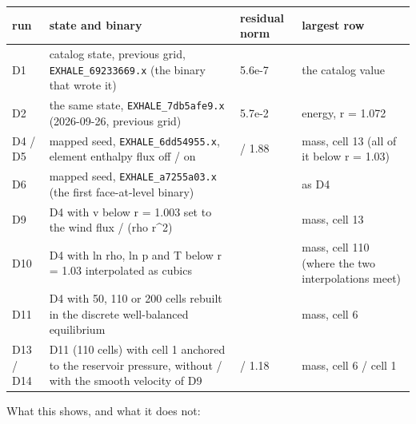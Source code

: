 \documentclass[english,a4paper]{my_memo}
\begin{document}
{\def\LTcaptype{none} %
{\small
\begin{longtable}[]{@{}>{\raggedright\arraybackslash}p{\dimexpr(\linewidth-8\tabcolsep)/4\relax}>{\raggedright\arraybackslash}p{\dimexpr(\linewidth-8\tabcolsep)/4\relax}>{\raggedright\arraybackslash}p{\dimexpr(\linewidth-8\tabcolsep)/4\relax}>{\raggedright\arraybackslash}p{\dimexpr(\linewidth-8\tabcolsep)/4\relax}@{}}
\toprule\noalign{}
run & state and binary & residual norm & largest row \\
\midrule\noalign{}
\endhead
\bottomrule\noalign{}
\endlastfoot
D1 & catalog state, previous grid, \texttt{EXHALE\_69233669.x} (the binary that wrote it) & 5.6e-7 & the catalog value \\
D2 & the same state, \texttt{EXHALE\_7db5afe9.x} (2026-09-26, previous grid) & 5.7e-2 & energy, r = 1.072 \\
D4 / D5 & mapped seed, \texttt{EXHALE\_6dd54955.x}, element enthalpy flux off / on & 1.88 / 1.88 & mass, cell 13 (all of it below r = 1.03) \\
D6 & mapped seed, \texttt{EXHALE\_a7255a03.x} (the first face-at-level binary) & 1.88 & as D4 \\
D9 & D4 with v below r = 1.003 set to the wind flux / (rho r\^{}2) & 1.86 & mass, cell 13 \\
D10 & D4 with ln rho, ln p and T below r = 1.03 interpolated as cubics & 1.82 & mass, cell 110 (where the two interpolations meet) \\
D11 & D4 with 50, 110 or 200 cells rebuilt in the discrete well-balanced equilibrium & 1.54 & mass, cell 6 \\
D13 / D14 & D11 (110 cells) with cell 1 anchored to the reservoir pressure, without / with the smooth velocity of D9 & 1.54 / 1.18 & mass, cell 6 / cell 1 \\
\end{longtable}
}
}

What this shows, and what it does not:
\end{document}
